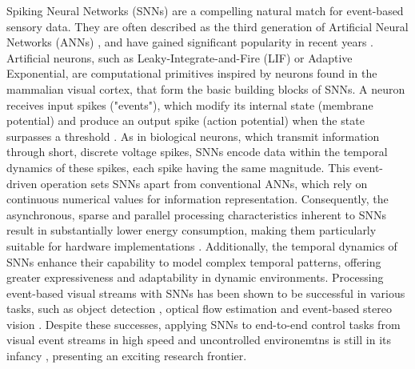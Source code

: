 \documentclass{article}
\begin{document}
Spiking Neural Networks (SNNs) are a compelling natural match for event-based sensory data. They are often described as the third generation of Artificial Neural Networks (ANNs) \cite{maassNetworksSpikingNeurons1997a}, and have gained significant popularity in recent years \cite{gallegoEventbasedVisionSurvey2022}. Artificial neurons, such as Leaky-Integrate-and-Fire (LIF) or Adaptive Exponential, are computational primitives inspired by neurons found in the mammalian visual cortex, that form the basic building blocks of SNNs. A neuron receives input spikes ("events"), which modify its internal state (membrane potential) and produce an output spike (action potential) when the state surpasses a threshold \cite{gallegoEventbasedVisionSurvey2022}. As in biological neurons, which transmit information through short, discrete voltage spikes, SNNs encode data within the temporal dynamics of these spikes, each spike having the same magnitude. This event-driven operation sets SNNs apart from conventional ANNs, which rely on continuous numerical values for information representation. Consequently, the asynchronous, sparse and parallel processing characteristics inherent to SNNs result in substantially lower energy consumption, making them particularly suitable for hardware implementations \cite{farsaLowCostHighSpeedNeuromorphic2019, siddiqueLowCostNeuromorphic2023}. Additionally, the temporal dynamics of SNNs enhance their capability to model complex temporal patterns, offering greater expressiveness and adaptability in dynamic environments. Processing event-based visual streams with SNNs has been shown to be successful in various tasks, such as object detection \cite{iaboniEventbasedSpikingNeural2024}, optical flow estimation \cite{cuadradoOpticalFlowEstimation2023} and event-based stereo vision \cite{osswaldSpikingNeuralNetwork2017}. Despite these successes, applying SNNs to end-to-end control tasks from visual event streams in high speed and uncontrolled environemtns is still in its infancy \cite{stroobantsNeuromorphicAttitudeEstimation2025, paredes-vallesFullyNeuromorphicVision2023b, onizTrajectoryControlQuadrotors2024}, presenting an exciting research frontier. 
\end{document}
